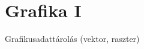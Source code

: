 \documentclass[../../main.tex]{subfiles}
\begin{document}
\section{Grafika I}

\begin{fulltheorem}
	Grafikusadattárolás (vektor, raszter)
\end{fulltheorem}
\end{document}
